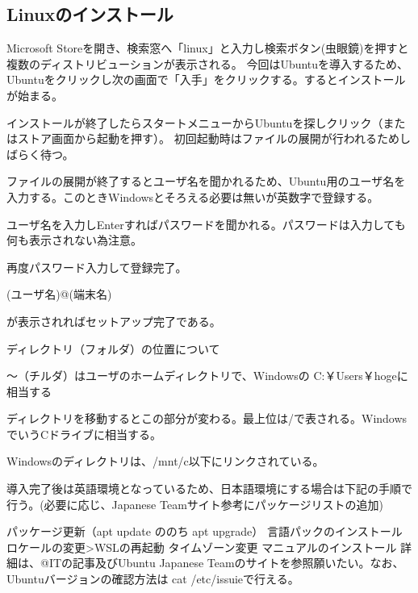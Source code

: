 \documentclass[autodetect-engine,dvipdfmx-if-dvi,ja=standard,a4j]{bxjsarticle}
\begin{document}
		\subsection{Linuxのインストール}
			Microsoft Storeを開き、検索窓へ「linux」と入力し検索ボタン(虫眼鏡)を押すと複数のディストリビューションが表示される。
			今回はUbuntuを導入するため、Ubuntuをクリックし次の画面で「入手」をクリックする。するとインストールが始まる。\par
			インストールが終了したらスタートメニューからUbuntuを探しクリック（またはストア画面から起動を押す）。
			初回起動時はファイルの展開が行われるためしばらく待つ。\par\noindent
			ファイルの展開が終了するとユーザ名を聞かれるため、Ubuntu用のユーザ名を入力する。このときWindowsとそろえる必要は無いが英数字で登録する。\par\noindent
			ユーザ名を入力しEnterすればパスワードを聞かれる。パスワードは入力しても何も表示されない為注意。\par\noindent
			再度パスワード入力して登録完了。\par
			{\color[rgb]{green}(ユーザ名)@(端末名)}\par
			が表示されればセットアップ完了である。\par
			ディレクトリ（フォルダ）の位置について\par
			～（チルダ）はユーザのホームディレクトリで、Windowsの C:￥Users￥hogeに相当する\par
			ディレクトリを移動するとこの部分が変わる。最上位は/で表される。WindowsでいうCドライブに相当する。\par
			Windowsのディレクトリは、/mnt/c以下にリンクされている。\par
			導入完了後は英語環境となっているため、日本語環境にする場合は下記の手順で行う。(必要に応じ、Japanese Teamサイト参考にパッケージリストの追加)\par
			パッケージ更新（apt update ののち apt upgrade）
			言語パックのインストール
			ロケールの変更>WSLの再起動
			タイムゾーン変更
			マニュアルのインストール
			詳細は、@ITの記事及びUbuntu Japanese Teamのサイトを参照願いたい。なお、Ubuntuバージョンの確認方法は cat /etc/issuieで行える。\par
\end{document}
